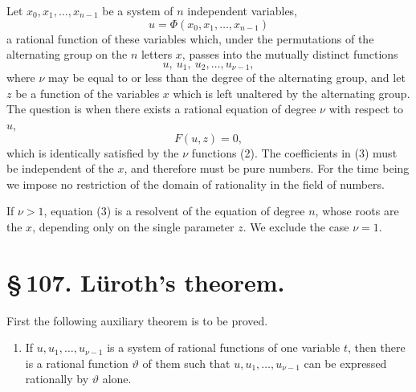 \documentclass[11pt]{article}
\begin{document}
Let \(x_0,x_1,\ldots,x_{n-1}\) be a system of \(n\) independent variables,
\begin{equation}
u=\Phi(x_0,x_1,\ldots,x_{n-1})
\tag{1}
\end{equation}
a rational function of these variables which, under the permutations of the alternating group on the \(n\) letters \(x\), passes into the mutually distinct functions
\begin{equation}
u,\ u_1,\ u_2,\ldots,u_{\nu-1},
\tag{2}
\end{equation}
where \(\nu\) may be equal to or less than the degree of the alternating group, and let \(z\) be a function of the variables \(x\) which is left unaltered by the alternating group. The question is when there exists a rational equation of degree \(\nu\) with respect to \(u\),
\begin{equation}
F(u,z)=0,
\tag{3}
\end{equation}
which is identically satisfied by the \(\nu\) functions (2). The coefficients in (3) must be independent of the \(x\), and therefore must be pure numbers. For the time being we impose no restriction of the domain of rationality in the field of numbers.

If \(\nu>1\), equation (3) is a resolvent of the equation of degree \(n\), whose roots are the \(x\), depending only on the single parameter \(z\). We exclude the case \(\nu=1\).

\section*{\S\,107. Lüroth's theorem.}

First the following auxiliary theorem is to be proved.

\begin{enumerate}[label=\arabic*.]
\item If \(u,u_1,\ldots,u_{\nu-1}\) is a system of rational functions of one variable \(t\), then there is a rational function \(\vartheta\) of them such that \(u,u_1,\ldots,u_{\nu-1}\) can be expressed rationally by \(\vartheta\) alone.
\end{enumerate}
\end{document}
